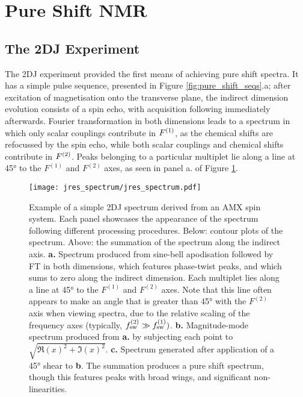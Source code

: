\section{Pure Shift NMR}

\subsection{The \acl{2DJ} Experiment}
The \ac{2DJ} experiment\cite{Aue1976, Morris2009} provided the first means of
achieving pure shift spectra. It has a simple pulse sequence, presented in
Figure \ref{fig:pure_shift_seqs}.a; after excitation of magnetisation onto the
transverse plane, the indirect dimension evolution consists of a spin echo, with
acquisition following immediately afterwards. Fourier transformation in both
dimensions leads to a spectrum in which only scalar couplings contribute in
$F^{(1)}$, as the chemical shifts are refocussed by the spin echo, while both
scalar couplings and chemical shifts contribute in $F^{(2)}$.
Peaks belonging to a particular multiplet lie along a line at \ang{45} to the
$F^{(1)}$ and $F^{(2)}$ axes, as seen in panel a. of Figure
\ref{fig:jres_spectrum}.
\begin{figure}%
    \centering%
    \texttt{[image: jres\_spectrum/jres\_spectrum.pdf]}%
    \caption[
        Example of a simple \acs{2DJ} spectra derived from an AMX spin system,
        processes in different ways.
    ]
    {%
        Example of a simple \acs{2DJ} spectrum derived from an AMX spin system.
        Each panel showcases the appearance of the spectrum following different
        processing procedures. Below: contour plots of the spectrum. Above: the
        summation of the spectrum along the indirect axis.
        \textbf{a.} Spectrum produced from sine-bell apodisation followed by
        \ac{FT} in both dimensions, which features phase-twist peaks, and which
        sums to zero along the indirect dimension. Each multiplet lies along a
        line at \ang{45} to the $F^{(1)}$ and $F^{(2)}$ axes. Note that this
        line often appears to make an angle that is greater than \ang{45} with
        the $F^{(2)}$ axis when viewing spectra, due to the relative scaling of
        the frequency axes (typically, $f_{\mathrm{sw}}^{(2)} \gg f_{\mathrm{sw}}^{(1)})$.
        \textbf{b.} Magnitude-mode spectrum produced from \textbf{a.} by
        subjecting each point to $\sqrt{\Re(x)^2 + \Im(x)^2}$.
        \textbf{c.} Spectrum generated after application of a \ang{45} shear to
        \textbf{b}.  The summation produces a pure shift spectrum, though this
        features peaks with broad wings, and significant non-linearities.
   }%
    \label{fig:jres_spectrum}%
\end{figure}%

